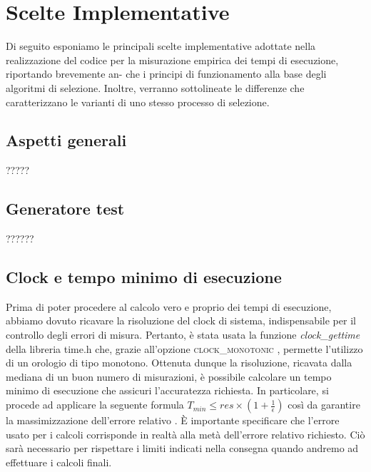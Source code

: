 \section{Scelte Implementative}
Di seguito esponiamo le principali scelte implementative adottate nella realizzazione del codice per la misurazione empirica dei tempi di esecuzione, riportando brevemente an- che i principi di funzionamento alla base degli algoritmi di selezione. Inoltre, verranno sottolineate le differenze che caratterizzano le varianti di uno stesso processo di selezione.

\subsection{Aspetti generali}
?????

\subsection{Generatore test}
??????

\subsection{Clock e tempo minimo di esecuzione}
Prima di poter procedere al calcolo vero e proprio dei tempi di esecuzione, abbiamo dovuto 
ricavare la risoluzione del clock di sistema, 
indispensabile per il controllo degli errori
di misura.
Pertanto, è stata usata la funzione \textit{\itshape clock\_gettime}  della libreria time.h che,
grazie all’opzione \textsc{\scshape clock\_monotonic} , permette l’utilizzo di un orologio di tipo monotono.
Ottenuta dunque la risoluzione, ricavata dalla mediana di un buon numero di misurazioni,
è possibile calcolare un tempo minimo di esecuzione che assicuri l’accuratezza richiesta.
In particolare, si procede ad applicare la seguente formula 
$T_{min} \leq res\times(1+\frac{1}{\epsilon})$
così da garantire la massimizzazione dell’errore relativo . È importante specificare che l’errore usato per i 
calcoli corrisponde in realtà alla metà dell’errore relativo richiesto. Ciò sarà necessario per rispettare i 
limiti indicati nella consegna quando andremo ad effettuare i calcoli finali.

